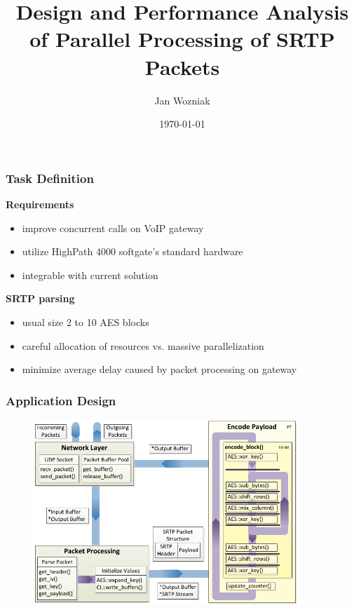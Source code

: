 \documentclass[10pt, xcolor=pdflatex, dvipsnames, table]{beamer}
\title{Design and Performance Analysis of Parallel
Processing of SRTP Packets}
\author{Jan Wozniak}
\institute[FIT VUT]{Vysoké učení technické v~Brně\\
Fakulta informační technologií}
\date{\today}
\begin{document}
\begin{frame}[plain]
\titlepage
\end{frame}

\begin{frame}
\frametitle{Task Definition}
\textbf{Requirements}
\begin{itemize}
\item improve concurrent calls on VoIP gateway
\item utilize HighPath 4000 softgate's standard hardware
\item integrable with current solution
\end{itemize}

\vspace{1em}

\textbf{SRTP parsing}
\begin{itemize}
\item usual size 2 to 10 AES blocks
\item careful allocation of resources vs. massive parallelization 
\item minimize average delay caused by packet processing on gateway
\end{itemize}
\end{frame}




\begin{frame}
\frametitle{Application Design}
\begin{figure}[H]
\centering
\includegraphics[width=10cm,keepaspectratio]{img/paral_scheme.pdf}
\end{figure}
\end{frame}
\end{document}
